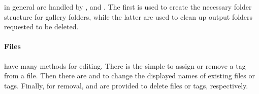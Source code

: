 in general are handled by ,  and
. The first is used to create the necessary folder
structure for gallery folders, while the latter are used to clean up output
folders requested to be deleted.

\paragraph{Files}

have many methods for editing. There is the simple
 to assign or remove a tag from a file. Then there are
 and  to change the displayed names of
existing files or tags. Finally, for removal,  and
 are provided to delete files or tags, respectively.
